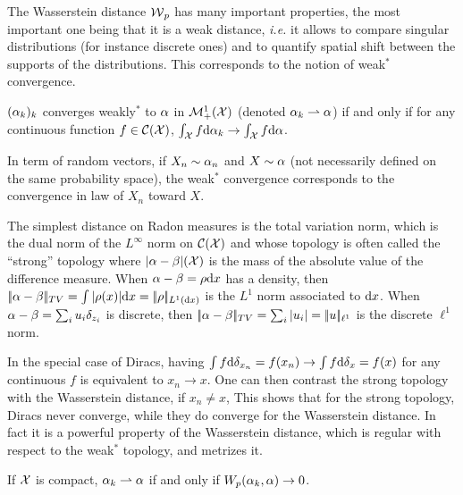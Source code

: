 The Wasserstein distance $\operatorname{\mathcal{W}}_p$ has many important properties, the most important one being that it is a weak distance, \emph{i.e.} it allows to compare singular distributions (for instance discrete ones) and to quantify spatial shift between the supports of the distributions. This corresponds to the notion of weak$^*$ convergence.

\begin{defn}\label{dfn-weak-conv}
	$(\alpha_k)_k$ converges weakly$^*$ to $\alpha$ in $\mathcal{M}_+^1(\mathcal{X})$ (denoted $\alpha_k \rightharpoonup \alpha$) if and only if for any continuous function $f \in \mathcal{C}(\mathcal{X})$, $\int_{\mathcal{X}} f \mathrm{d}\alpha_k \rightarrow \int_{\mathcal{X}} f \mathrm{d}\alpha$.
\end{defn}

In term of random vectors, if $X_n \sim \alpha_n$ and $X \sim \alpha$ (not necessarily defined on the same probability space), the weak$^*$ convergence corresponds to the convergence in law of $X_n$ toward $X$.

\begin{defn}
The simplest distance on Radon measures is the total variation norm, which is the dual norm of the $L^\infty$ norm on $\mathcal{C}(\mathcal{X})$ and whose topology is often called the ``strong'' topology
where $|\alpha-\beta|(\mathcal{X})$ is the mass of the absolute value of the difference measure. When $\alpha-\beta=\rho \mathrm{d} x$ has a density, then $|\!| \alpha-\beta |\!|_{TV}=\int |\rho(x)| \mathrm{d} x=|\!| \rho |\!|_{L^1(\mathrm{d} x)}$ is the $L^1$ norm associated to $\mathrm{d} x$. When $\alpha-\beta=\sum_i u_i \delta_{z_i}$ is discrete, then $|\!| \alpha-\beta |\!|_{TV}=\sum_i |u_i|=|\!| u |\!|_{\ell^1}$ is the discrete $\ell^1$ norm. 
\end{defn}

In the special case of Diracs, having $\int f \mathrm{d}\delta_{x_n} = f(x_n) \rightarrow \int f \mathrm{d}\delta_{x} = f(x)$ for any continuous $f$ is equivalent to $x_n \rightarrow x$. One can then contrast the strong topology with the Wasserstein distance, if $x_n \neq x$, 
This shows that for the strong topology, Diracs never converge, while they do converge for the Wasserstein distance. In fact it is a powerful property of the Wasserstein distance, which is regular with respect to the weak$^*$ topology, and metrizes it.

\begin{prop}
	If $\mathcal{X}$ is compact, $\alpha_k \rightharpoonup \alpha$ if and only if $W_p(\alpha_k,\alpha) \rightarrow 0$. 
\end{prop}

